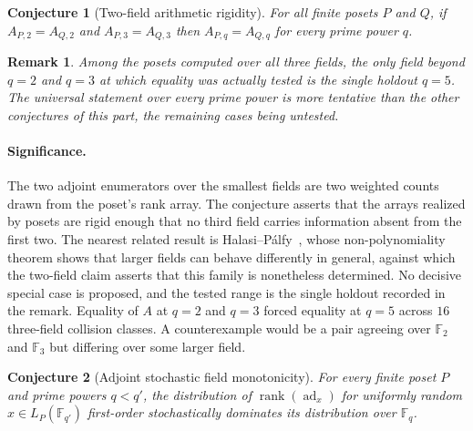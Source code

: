 \documentclass[11pt]{article}
\newtheorem{conjecture}{Conjecture}
\newtheorem{remark}{Remark}
\theoremstyle{definition}
\newcommand{\rank}{\operatorname{rank}}
\newcommand{\Fq}{\mathbb F}
\begin{document}
\begin{conjecture}[Two-field arithmetic rigidity]\label{v9}
For all finite posets $P$ and $Q$, if $A_{P,2}=A_{Q,2}$ and $A_{P,3}=A_{Q,3}$ then $A_{P,q}=A_{Q,q}$ for every prime power $q$.
\end{conjecture}

\begin{remark}
Among the posets computed over all three fields, the only field beyond $q=2$ and $q=3$ at which equality was actually tested is the single holdout $q=5$.  The universal statement over every prime power is more tentative than the other conjectures of this part, the remaining cases being untested.
\end{remark}

\paragraph{Significance.}
The two adjoint enumerators over the smallest fields are two weighted counts drawn from the poset's rank array.  The conjecture asserts that the arrays realized by posets are rigid enough that no third field carries information absent from the first two.  The nearest related result is Halasi--P\'alfy~\cite{HP}, whose non-polynomiality theorem shows that larger fields can behave differently in general, against which the two-field claim asserts that this family is nonetheless determined.  No decisive special case is proposed, and the tested range is the single holdout recorded in the remark.  Equality of $A$ at $q=2$ and $q=3$ forced equality at $q=5$ across $16$ three-field collision classes.  A counterexample would be a pair agreeing over $\Fq_2$ and $\Fq_3$ but differing over some larger field.

\begin{conjecture}[Adjoint stochastic field monotonicity]\label{v10}
For every finite poset $P$ and prime powers $q<q'$, the distribution of $\rank(\operatorname{ad}_x)$ for uniformly random $x\in L_P(\Fq_{q'})$ first-order stochastically dominates its distribution over $\Fq_q$.
\end{conjecture}
\end{document}
